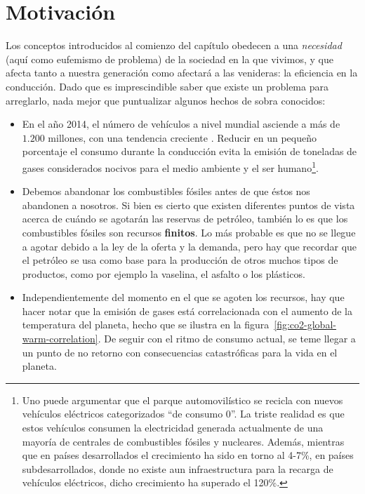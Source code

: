 \section{Motivación}

Los conceptos introducidos al comienzo del capítulo obedecen a una \textit{necesidad} (aquí como eufemismo de problema) de la sociedad en la que vivimos, y que afecta tanto a nuestra generación como afectará a las venideras: la eficiencia en la conducción. Dado que es imprescindible saber que existe un problema para arreglarlo, nada mejor que puntualizar algunos hechos de sobra conocidos:

\begin{itemize}
	\item En el año 2014, el número de vehículos a nivel mundial asciende a más de $1.200$ millones, con una tendencia creciente \cite{oica2014motrate}. Reducir en un pequeño porcentaje el consumo durante la conducción evita la emisión de toneladas de gases considerados nocivos para el medio ambiente y el ser humano\footnote{Uno puede argumentar que el parque automovilístico se recicla con nuevos vehículos eléctricos categorizados \enquote{de consumo 0}. La triste realidad es que estos vehículos consumen la electricidad generada actualmente de una mayoría de centrales de combustibles fósiles y nucleares. Además, mientras que en países desarrollados el crecimiento ha sido en torno al 4-7\%, en países subdesarrollados, donde no existe aun infraestructura para la recarga de vehículos eléctricos, dicho crecimiento ha superado el 120\%.}.
	\item Debemos abandonar los combustibles fósiles antes de que éstos nos abandonen a nosotros. Si bien es cierto que existen diferentes puntos de vista acerca de cuándo se agotarán las reservas de petróleo, también lo es que los combustibles fósiles son recursos \textbf{finitos}. Lo más probable es que no se llegue a agotar debido a la ley de la oferta y la demanda, pero hay que recordar que el petróleo se usa como base para la producción de otros muchos tipos de productos, como por ejemplo la vaselina, el asfalto o los plásticos.
	\item Independientemente del momento en el que se agoten los recursos, hay que hacer notar que la emisión de gases está correlacionada con el aumento de la temperatura del planeta, hecho que se ilustra en la figura~\ref{fig:co2-global-warm-correlation}. De seguir con el ritmo de consumo actual, se teme llegar a un punto de no retorno con consecuencias catastróficas para la vida en el planeta.


\end{itemize}
